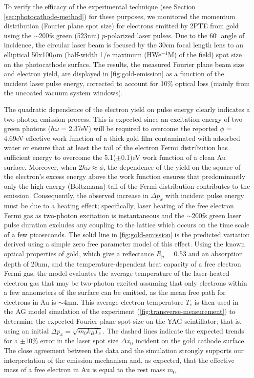 To verify the efficacy of the experimental technique (see Section \ref{sec:photocathode-method}) for these purposes, we monitored the momentum distribution (Fourier plane spot size) for electrons emitted by 2PTE from gold using the $\sim$200fs green (523nm) $p$-polarized laser pulses.
Due to the 60$^{\circ}$ angle of incidence, the circular laser beam is focused by the 30cm focal length lens to an elliptical 50x100$\mu$m (half-width 1/e maximum (HWe$^{-1}$M) of the field) spot size on the photocathode surface.
The results, the measured Fourier plane beam size and electron yield, are displayed in \ref{fig:gold-emission} as a function of the incident laser pulse energy, corrected to account for 10\% optical loss (mainly from the uncoated vacuum system windows).

The quadratic dependence of the electron yield on pulse energy clearly indicates a two-photon emission process.
This is expected since an excitation energy of two green photons ($\hbar \omega$ = 2.37eV) will be required to overcome the reported $\phi$ = 4.69eV effective work function of a thick gold film contaminated with adsorbed water\cite{monjushiro_ultraviolet_1991} or ensure that at least the tail of the electron Fermi distribution has sufficient energy to overcome the 5.1($\pm$0.1)eV work function of a clean Au surface\cite{eastman_photoelectric_1970}.
Moreover, when $2\hbar \omega \approx \phi$, the dependence of the yield on the square of the electron's excess energy above the work function\cite{monjushiro_ultraviolet_1991} ensures that predominantly only the high energy (Boltzmann) tail of the Fermi distribution contributes to the emission.
Consequently, the observed increase in $\Delta p_x$ with incident pulse energy must be due to a heating effect; specifically, laser heating of the free electron Fermi gas as two-photon excitation is instantaneous and the $\sim$200fs green laser pulse duration excludes any coupling to the lattice which occurs on the time scale of a few picoseconds\cite{chen_semiclassical_2006}.
The solid line in \ref{fig:gold-emission} is the predicted variation derived using a simple zero free parameter model of this effect.
Using the known optical properties of gold\cite{johnson_optical_1972}, which give a reflectance $R_p$ = 0.53 and an absorption depth of 20nm, and the temperature-dependent heat capacity of a free electron Fermi gas, the model evaluates the average temperature of the laser-heated electron gas that may be two-photon excited assuming that only electrons within a few nanometers of the surface can be emitted, as the mean free path for electrons in Au is $\sim$4nm\cite{seah_quantitative_1979}.
This average electron temperature $T_e$ is then used in the AG model simulation of the experiment (\ref{fig:transverse-measurement}) to determine the expected Fourier plane spot size on the YAG scintillator; that is, using an initial $\Delta p_x = \sqrt{m_0 k_B T_e}$.  The dashed lines indicate the expected trends for a $\pm$10\% error in the laser spot size $\Delta x_0$ incident on the gold cathode surface.
The close agreement between the data and the simulation strongly supports our interpretation of the emission mechanism and, as expected, that the effective mass of a free electron in Au is equal to the rest mass $m_0$\cite{johnson_optical_1972}.

